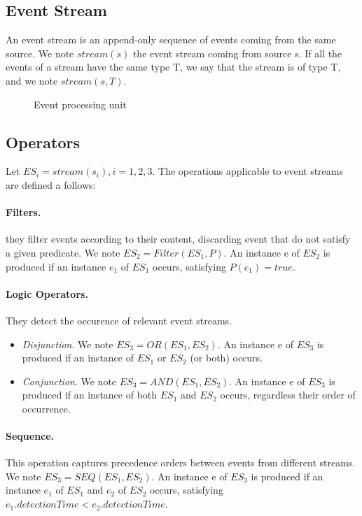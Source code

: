 \documentclass[a4paper,twoside]{article}
\begin{document}
\subsection{Event Stream}
An event stream is an append-only sequence of events coming from the same source. We note $stream(s)$ the event stream coming from source s. If all the events of a stream have the same type T, we say that the stream is of type T, and we note $stream(s,T)$. 

\begin{figure*}
  \centering
   {}
  \caption{Event processing unit}
  \label{fig:event processing unit}
 \end{figure*}

\subsection{Operators}
Let $ES_i = stream(s_i), i=1,2,3 $. 
The operations applicable to event streams are defined a follows:
\paragraph{Filters.} they filter events according to their content, discarding event that do not satisfy a given predicate. 
We note $ES_2 = Filter(ES_1, P)$. An instance e of $ES_2$ is produced if an instance $e_1$ of $ES_1$ occurs, satisfying $P(e_1) = true$.
\paragraph{Logic Operators.} They detect the occurence of relevant event streams.
\begin{itemize}
\item \textit{Disjunction}. We note $ES_3 = OR(ES_1, ES_2)$. An instance e of $ES_3$ is produced if an instance of $ES_1$ or $ES_2$ (or both) occurs.
\item \textit{Conjunction}. We note $ES_3 = AND(ES_1, ES_2)$. An instance e of $ES_3$ is produced if an instance of both $ES_1$ and $ES_2$ occurs, regardless their order of occurrence.
\end{itemize}
\paragraph{Sequence.} This operation captures precedence orders between events from different streams. We note $ES_3= SEQ(ES_1, ES_2)$. An instance e of $ES_3$ is produced if an instance $e_1$ of $ES_1$ and $e_2$ of $ES_2$ occurs, satisfying $e_{1}.detectionTime < e_{2}.detectionTime$. 
\end{document}
